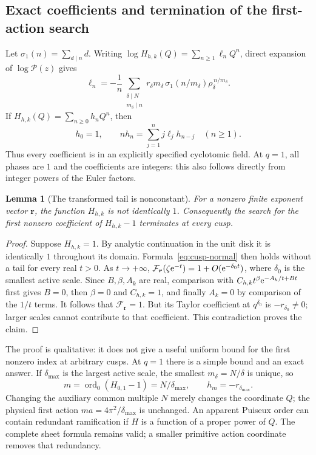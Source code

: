 \documentclass[11pt,a4paper]{article}
\numberwithin{equation}{section}
\newtheorem{lemma}[theorem]{Lemma}
\theoremstyle{definition}\newtheorem{definition}[theorem]{Definition}
\theoremstyle{remark}\newtheorem{remark}[theorem]{Remark}
\newcommand{\ord}{\operatorname{ord}}\newcommand{\id}{\operatorname{id}}
\newcommand{\Poch}{\mathcal P}\newcommand{\F}{\mathcal F}
\newcommand{\vct}[1]{\boldsymbol{#1}}
\begin{document}
\subsection{Exact coefficients and termination of the first-action search}
Let $\sigma_1(n)=\sum_{d\mid n}d$. Writing
$\log H_{h,k}(Q)=\sum_{n\ge1}\ell_nQ^n$, direct expansion of
$\log\Poch(z)$ gives
\begin{equation}\label{eq:logH}
 \ell_n=-\frac1n
 \sum_{\substack{\delta\mid N\\m_\delta\mid n}}
 r_\delta m_\delta\,
 \sigma_1(n/m_\delta)\rho_\delta^{\,n/m_\delta}.
\end{equation}
If $H_{h,k}(Q)=\sum_{n\ge0}h_nQ^n$, then
\begin{equation}\label{eq:H-rec}
 h_0=1,\qquad
 nh_n=\sum_{j=1}^n j\ell_jh_{n-j}\quad(n\ge1).
\end{equation}
Thus every coefficient is in an explicitly specified cyclotomic field.
At $q=1$, all phases are $1$ and the coefficients are integers: this
also follows directly from integer powers of the Euler factors.

\begin{lemma}[The transformed tail is nonconstant]\label{lem:H-nonconstant}
For a nonzero finite exponent vector $\vct r$, the function $H_{h,k}$
is not identically $1$. Consequently the search for the first nonzero
coefficient of $H_{h,k}-1$ terminates at every cusp.
\end{lemma}
\begin{proof}
Suppose $H_{h,k}=1$. By analytic continuation in the unit disk it is
identically $1$ throughout its domain. Formula~\eqref{eq:cusp-normal}
then holds without a tail for every real $t>0$. As $t\to+\infty$,
$\F_{\vct r}(\zeta\e^{-t})=1+O(\e^{-\delta_0t})$, where
$\delta_0$ is the smallest active scale. Since $B,\beta,A_k$ are real,
comparison with $C_{h,k}t^\beta\mathrm e^{-A_k/t+Bt}$ first gives
$B=0$, then $\beta=0$ and $C_{h,k}=1$, and finally $A_k=0$ by
comparison of the $1/t$ terms. It follows that $\F_{\vct r}=1$.
But its Taylor coefficient at $q^{\delta_0}$ is $-r_{\delta_0}\ne0$;
larger scales cannot contribute to that coefficient. This contradiction
proves the claim.
\end{proof}
The proof is qualitative: it does not give a useful uniform bound for
the first nonzero index at arbitrary cusps. At $q=1$ there is a simple
bound and an exact answer. If $\delta_{\max}$ is the largest active
scale, the smallest $m_\delta=N/\delta$ is unique, so
\begin{equation}\label{eq:first-q1}
 m=\ord_0(H_{0,1}-1)=N/\delta_{\max},\qquad h_m=-r_{\delta_{\max}}.
\end{equation}
Changing the auxiliary common multiple $N$ merely changes the coordinate
$Q$; the physical first action $ma=4\pi^2/\delta_{\max}$ is unchanged.
An apparent Puiseux order can contain redundant ramification if $H$ is
a function of a proper power of $Q$. The complete sheet formula remains
valid; a smaller primitive action coordinate removes that redundancy.
\end{document}
